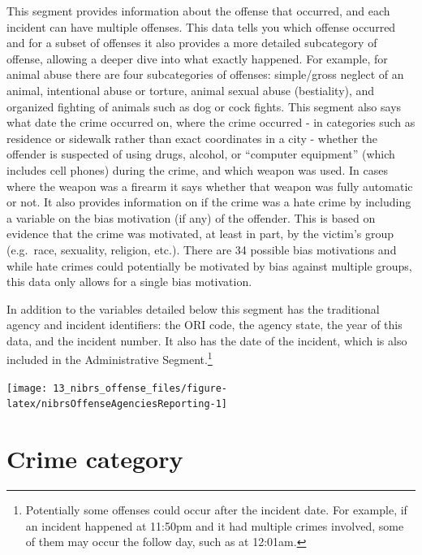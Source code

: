 \documentclass[
]{krantz}
\let\origfigure\figure
\let\endorigfigure\endfigure
\renewenvironment{figure}[1][2] {
    \expandafter\origfigure\expandafter[H]
} {
    \endorigfigure
}
\begin{document}
This segment provides information about the offense that
occurred, and each incident can have multiple offenses. This
data tells you which offense occurred and for a subset of
offenses it also provides a more detailed subcategory of
offense, allowing a deeper dive into what exactly happened.
For example, for animal abuse there are four subcategories
of offenses: simple/gross neglect of an animal, intentional
abuse or torture, animal sexual abuse (bestiality), and
organized fighting of animals such as dog or cock fights.
This segment also says what date the crime occurred on,
where the crime occurred - in categories such as residence
or sidewalk rather than exact coordinates in a city -
whether the offender is suspected of using drugs, alcohol,
or ``computer equipment'' (which includes cell phones)
during the crime, and which weapon was used. In cases where
the weapon was a firearm it says whether that weapon was
fully automatic or not. It also provides information on if
the crime was a hate crime by including a variable on the
bias motivation (if any) of the offender. This is based on
evidence that the crime was motivated, at least in part, by
the victim's group (e.g.~race, sexuality, religion, etc.).
There are 34 possible bias motivations and while hate crimes
could potentially be motivated by bias against multiple
groups, this data only allows for a single bias motivation.

In addition to the variables detailed below this segment has
the traditional agency and incident identifiers: the ORI
code, the agency state, the year of this data, and the
incident number. It also has the date of the incident, which
is also included in the Administrative Segment.\footnote{Potentially
  some offenses could occur after the incident date. For
  example, if an incident happened at 11:50pm and it had
  multiple crimes involved, some of them may occur the
  follow day, such as at 12:01am.}

\begin{figure}

{\centering \texttt{[image: 13\_nibrs\_offense\_files/figure-latex/nibrsOffenseAgenciesReporting-1]} 

}

\caption{The annual number of agencies reporting data in the NIBRS Offense Segment, 1991-2022.}\label{fig:nibrsOffenseAgenciesReporting}
\end{figure}

\section{Crime category}\label{crime-category}
\end{document}
